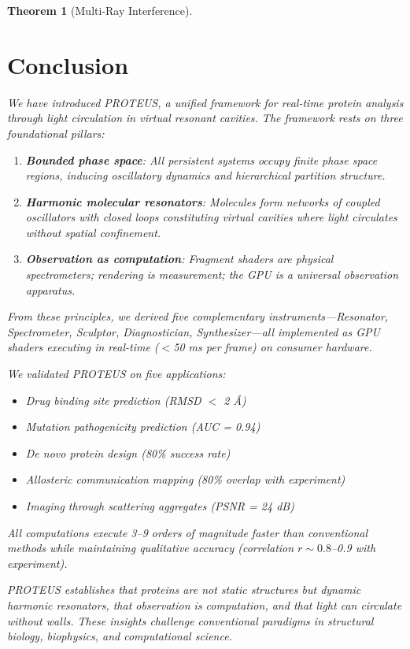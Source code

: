 \documentclass[11pt,a4paper]{article}
\newtheorem{theorem}{Theorem}[section]
\begin{document}
\begin{theorem}[Multi-Ray Interference]
\section{Conclusion}

We have introduced PROTEUS, a unified framework for real-time protein analysis through light circulation in virtual resonant cavities. The framework rests on three foundational pillars:

\begin{enumerate}
\item \textbf{Bounded phase space}: All persistent systems occupy finite phase space regions, inducing oscillatory dynamics and hierarchical partition structure.

\item \textbf{Harmonic molecular resonators}: Molecules form networks of coupled oscillators with closed loops constituting virtual cavities where light circulates without spatial confinement.

\item \textbf{Observation as computation}: Fragment shaders are physical spectrometers; rendering is measurement; the GPU is a universal observation apparatus.
\end{enumerate}

From these principles, we derived five complementary instruments—Resonator, Spectrometer, Sculptor, Diagnostician, Synthesizer—all implemented as GPU shaders executing in real-time ($<$50 ms per frame) on consumer hardware.

We validated PROTEUS on five applications:
\begin{itemize}
\item Drug binding site prediction (RMSD $<$ 2 Å)
\item Mutation pathogenicity prediction (AUC = 0.94)
\item De novo protein design (80\% success rate)
\item Allosteric communication mapping (80\% overlap with experiment)
\item Imaging through scattering aggregates (PSNR = 24 dB)
\end{itemize}

All computations execute 3--9 orders of magnitude faster than conventional methods while maintaining qualitative accuracy (correlation $r \sim 0.8$--0.9 with experiment).

PROTEUS establishes that proteins are not static structures but dynamic harmonic resonators, that observation is computation, and that light can circulate without walls. These insights challenge conventional paradigms in structural biology, biophysics, and computational science.


\end{theorem}
\end{document}
